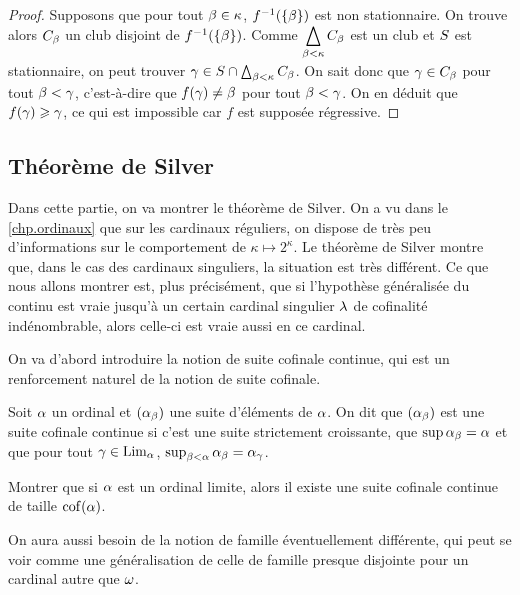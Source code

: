 \begin{proof}
  Supposons que pour tout $\beta \in \kappa$, $f^{-1}(\{\beta\})$ est non
  stationnaire. On trouve alors $C_\beta$ un club disjoint de
  $f^{-1}(\{\beta\})$. Comme
  $\displaystyle\bigtriangleup_{\beta<\kappa}C_\beta$ est un club et $S$
  est stationnaire, on peut trouver
  $\gamma \in S\cap \bigtriangleup_{\beta < \kappa} C_\beta$. On sait donc
  que $\gamma \in C_\beta$ pour tout $\beta < \gamma$, c'est-à-dire que
  $f(\gamma) \neq \beta$ pour tout $\beta < \gamma$. On en déduit que
  $f(\gamma) \geqslant \gamma$, ce qui est impossible car $f$ est supposée
  régressive.
\end{proof}

\subsection{Théorème de Silver}

Dans cette partie, on va montrer le théorème de Silver. On a vu dans le
\cref{chp.ordinaux} que sur les cardinaux réguliers, on dispose de très peu
d'informations sur le comportement de $\kappa \mapsto 2^\kappa$. Le théorème de
Silver montre que, dans le cas des cardinaux singuliers, la situation est très
différent. Ce que nous allons montrer est, plus précisément, que si l'hypothèse
généralisée du continu est vraie jusqu'à un certain cardinal singulier
$\lambda$ de cofinalité indénombrable, alors celle-ci est vraie aussi en ce
cardinal.

On va d'abord introduire la notion de suite cofinale continue, qui est un
renforcement naturel de la notion de suite cofinale.

\begin{definition}
  Soit $\alpha$ un ordinal et $(\alpha_\beta)$ une suite d'éléments de $\alpha$.
  On dit que $(\alpha_\beta)$ est une suite cofinale continue si c'est une
  suite strictement croissante, que $\sup\alpha_\beta = \alpha$ et que pour
  tout $\gamma \in\operatorname{Lim}_\alpha$, $\sup_{\beta < \alpha} \alpha_\beta = \alpha_\gamma$.
\end{definition}

\begin{exercise}
  Montrer que si $\alpha$ est un ordinal limite, alors il existe une suite
  cofinale continue de taille $\operatorname{cof}(\alpha)$.
\end{exercise}

On aura aussi besoin de la notion de famille éventuellement différente, qui
peut se voir comme une généralisation de celle de famille presque disjointe pour
un cardinal autre que $\omega$.

